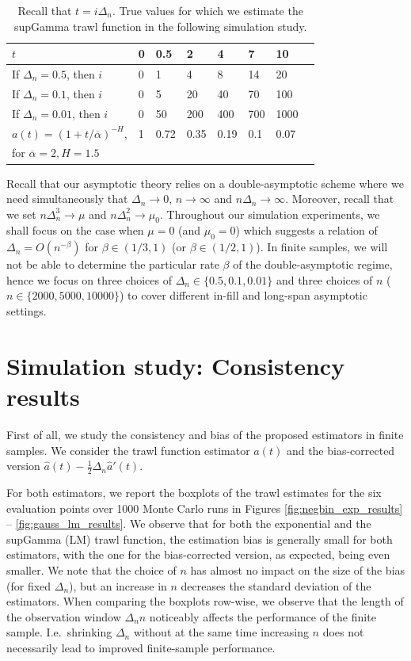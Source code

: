 \documentclass{article}
\theoremstyle{plain}
\theoremstyle{definition}
\theoremstyle{remark}
\begin{document}
\begin{appendix}
\begin{table}[htbp]
	\centering
	\begin{tabular}{l|lllllll}
		\toprule
		$t$&0& 0.5& 2& 4& 7& 10\\ \midrule
        If $\Delta_n=0.5$, then $i$ & 0&1&4&8&14&20 \\
		If $\Delta_n=0.1$, then $i$ & 0&5&20&40&70&100 \\
		If $\Delta_n=0.01$, then $i$ &0&50&200&400&700&1000
		\\ \midrule
		$a(t)=(1+t/\overline{\alpha})^{-H}$, & 1 &0.72 & 0.35 & 0.19 & 0.1 & 0.07  \\
		for  $\overline{\alpha} =2, H=1.5$ &&&&&&
		\\
		\bottomrule
	\end{tabular}
	\caption{\label{tab:Grid-fixedt_LM}
		Recall that $t=i\Delta_n$.  True values for which we estimate the supGamma trawl function in the following simulation study.
	}
\end{table}
Recall that our asymptotic theory relies on a double-asymptotic scheme where we need simultaneously that $\Delta_n \to 0$,  $n \to \infty$ and $n \Delta_n \to \infty$.
Moreover, recall that we set $n \Delta_n^3 \to \mu$ and $n \Delta_n^2 \to \mu_0$. 
Throughout our simulation experiments, we shall focus on the case when $\mu=0$ (and $\mu_0=0$) which suggests a relation of $\Delta_n=O(n^{-\beta})$ for $\beta \in (1/3,1)$ (or $\beta \in (1/2, 1)$). 
In finite samples, we will not be able to determine the particular rate $\beta$ of the double-asymptotic regime, hence we focus on three choices of $\Delta_n\in \{0.5, 0.1, 0.01\}$ and three choices of $n$ ($n\in \{2000, 5000, 10000\}$) to cover different in-fill and long-span asymptotic settings.




\section{Simulation study: Consistency results}\label{asec:consistency}

First of all, we study the consistency and bias of the proposed estimators in finite samples. 
We consider the trawl function estimator $\widehat a(t)$ and the bias-corrected version $\hat a(t)-\frac{1}{2}\Delta_n \hat a'(t)$.

For both estimators, we report the boxplots of the  trawl estimates for the six evaluation points over 1000 Monte Carlo runs
in Figures \ref{fig:negbin_exp_results} -- \ref{fig:gauss_lm_results}.
We observe that for both the exponential and the supGamma (LM) trawl function, the estimation bias is generally small for both estimators, with the one for the bias-corrected version, as expected, being even smaller. 
We note that the choice of $n$ has almost no impact on the size of the bias (for fixed $\Delta_n$), but an increase in $n$ decreases the standard deviation of the estimators.
When comparing the boxplots row-wise, we observe that the length of the observation window $\Delta_n n$ noticeably affects the performance of the finite sample. I.e.~shrinking $\Delta_n$ without at the same time increasing $n$ does not necessarily lead to improved finite-sample performance.  


\end{appendix}
\end{document}
